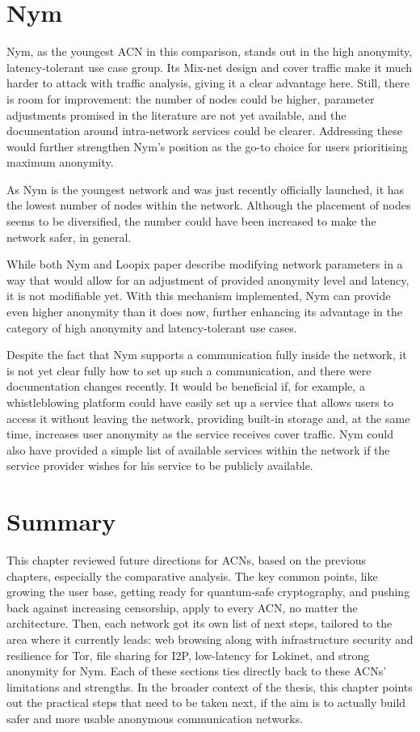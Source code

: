 \section{Nym}

Nym, as the youngest ACN in this comparison, stands out in the high anonymity, latency-tolerant use case group. Its Mix-net design and cover traffic make it much harder to attack with traffic analysis, giving it a clear advantage here. Still, there is room for improvement: the number of nodes could be higher, parameter adjustments promised in the literature are not yet available, and the documentation around intra-network services could be clearer. Addressing these would further strengthen Nym’s position as the go-to choice for users prioritising maximum anonymity.

As Nym is the youngest network and was just recently officially launched, it has the lowest number of nodes within the network. Although the placement of nodes seems to be diversified, the number could have been increased to make the network safer, in general.

While both Nym and Loopix paper describe modifying network parameters in a way that would allow for an adjustment of provided anonymity level and latency, it is not modifiable yet. With this mechanism implemented, Nym can provide even higher anonymity than it does now, further enhancing its advantage in the category of high anonymity and latency-tolerant use cases.

Despite the fact that Nym supports a communication fully inside the network, it is not yet clear fully how to set up such a communication, and there were documentation changes recently. It would be beneficial if, for example, a whistleblowing platform could have easily set up a service that allows users to access it without leaving the network, providing built-in storage and, at the same time, increases user anonymity as the service receives cover traffic. Nym could also have provided a simple list of available services within the network if the service provider wishes for his service to be publicly available.

\section{Summary}

This chapter reviewed future directions for ACNs, based on the previous chapters, especially the comparative analysis. The key common points, like growing the user base, getting ready for quantum-safe cryptography, and pushing back against increasing censorship, apply to every ACN, no matter the architecture. Then, each network got its own list of next steps, tailored to the area where it currently leads: web browsing along with infrastructure security and resilience for Tor, file sharing for I2P, low-latency for Lokinet, and strong anonymity for Nym. Each of these sections ties directly back to these ACNs' limitations and strengths. In the broader context of the thesis, this chapter points out the practical steps that need to be taken next, if the aim is to actually build safer and more usable anonymous communication networks.
